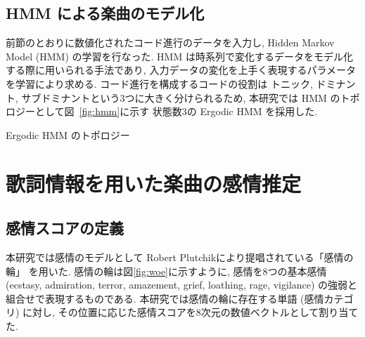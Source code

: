 \documentclass{jpreprint}
\begin{document}
\begin{multicols}{2}
\subsection{HMM による楽曲のモデル化}
前節のとおりに数値化されたコード進行のデータを入力し,
Hidden Markov Model (HMM) の学習を行なった.
HMM は時系列で変化するデータをモデル化する際に用いられる手法であり,
入力データの変化を上手く表現するパラメータを学習により求める.
コード進行を構成するコードの役割は
トニック, ドミナント, サブドミナントという3つに大きく分けられるため,
本研究では HMM のトポロジーとして図~\ref{fig:hmm}に示す
状態数3の Ergodic HMM を採用した.

\vspace{0.25cm}
\begin{figurehere}
  \centering
  \vspace{-0.5cm}
  \caption{Ergodic HMM のトポロジー}
  \label{fig:hmm}
\end{figurehere}

\section{歌詞情報を用いた楽曲の感情推定}
\subsection{感情スコアの定義}
本研究では感情のモデルとして
Robert Plutchikにより提唱されている「感情の輪」\cite{RP01} を用いた.
感情の輪は図\ref{fig:woe}に示すように,
感情を8つの基本感情 
(ecstasy, admiration, terror, amazement, grief, loathing, rage, vigilance)
の強弱と組合せで表現するものである.
本研究では感情の輪に存在する単語 (感情カテゴリ) に対し,
その位置に応じた感情スコアを8次元の数値ベクトルとして割り当てた.


\end{multicols}
\end{document}

